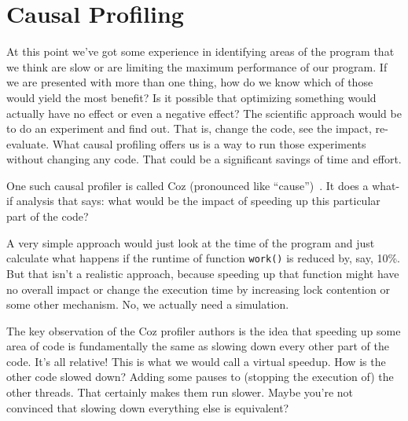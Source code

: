 




\section*{Causal Profiling}
At this point we've got some experience in identifying areas of the program that we think are slow or are limiting the maximum performance of our program. If we are presented with more than one thing, how do we know which of those would yield the most benefit? Is it possible that optimizing something would actually have no effect or even a negative effect? The scientific approach would be to do an experiment and find out. That is, change the code, see the impact, re-evaluate. What causal profiling offers us is a way to run those experiments without changing any code. That could be a significant savings of time and effort. 

One such causal profiler is called Coz (pronounced like ``cause'')~\cite{coz}. It does a what-if analysis that says: what would be the impact of speeding up this particular part of the code? 

A very simple approach would just look at the time of the program and just calculate what happens if the runtime of function \texttt{work()} is reduced by, say, 10\%. But that isn't a realistic approach, because speeding up that function might have no overall impact or change the execution time by increasing lock contention or some other mechanism. No, we actually need a simulation. 

The key observation of the Coz profiler authors is the idea that speeding up some area of code is fundamentally the same as slowing down every other part of the code. It's all relative! This is what we would call a virtual speedup. How is the other code slowed down? Adding some pauses to (stopping the execution of) the other threads. That certainly makes them run slower. Maybe you're not convinced that slowing down everything else is equivalent?


